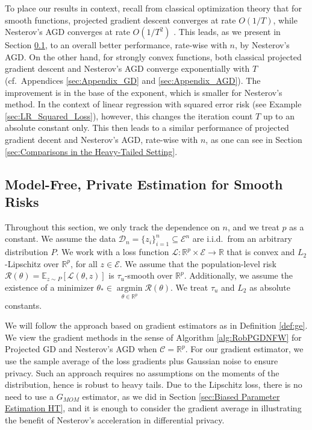 \documentclass{article}
\begin{document}
To place our results in context, recall from classical optimization theory that for smooth functions, projected gradient descent converges at rate $O\left(1/T\right)$, while Nesterov's AGD converges at rate $O\left(1/T^2\right)$ \cite{Nester}. This leads, as we present in Section \ref{sec:Smooth_Priv_HT_GD_AGD}, to an overall better performance, rate-wise with $n$, by Nesterov's AGD. On the other hand, for strongly convex functions, both classical projected gradient descent and Nesterov's AGD converge exponentially with $T$ (cf.\ Appendices \ref{sec:Appendix_GD} and \ref{sec:Appendix_AGD}). The improvement is in the base of the exponent, which is smaller for Nesterov's method. In the context of linear regression with squared error risk (see Example \ref{sec:LR_Squared_Loss}), however, this changes the iteration count $T$ up to an absolute constant only. This then leads to a similar performance of projected gradient decent and Nesterov's AGD, rate-wise with $n$, as one can see in Section \ref{sec:Comparisons in the Heavy-Tailed Setting}.


\subsection{Model-Free, Private Estimation for Smooth Risks}
\label{sec:Smooth_Priv_HT_GD_AGD}

Throughout this section, we only track the dependence on $n$, and we treat $p$ as a constant. We assume the data $\mathcal{D}_n = \{z_i\}_{i = 1}^n \subseteq \mathcal{E}^n$ are i.i.d.\ from an arbitrary distribution $P$. We work with a loss function $\mathcal{L} : \mathbb{R}^p \times \mathcal{E} \rightarrow \mathbb{R}$ that is convex and $L_2$-Lipschitz over $\mathbb{R}^p$, for all $z \in \mathcal{E}$. We assume that the population-level risk $\mathcal{R(\theta)} = \mathbb{E}_{z \sim P}[\mathcal{L}(\theta, z)]$ is $\tau_u$-smooth over $\mathbb{R}^p$. Additionally, we assume the existence of a minimizer $\theta_* \in \mathop{\arg\min}\limits_{\theta \in \mathbb{R}^p}\mathcal{R}(\theta)$. We treat $\tau_u$ and $L_2$ as absolute constants.

We will follow the approach based on gradient estimators as in Definition \ref{def:ge}. We view the gradient methods in the sense of Algorithm \ref{alg:RobPGDNFW} for Projected GD and Nesterov's AGD when $\mathcal{C} = \mathbb{R}^p$. For our gradient estimator, we use the sample average of the loss gradients plus Gaussian noise to ensure privacy. Such an approach requires no assumptions on the moments of the distribution, hence is robust to heavy tails. Due to the Lipschitz loss, there is no need to use a $G_{MOM}$ estimator, as we did in Section \ref{sec:Biased Parameter Estimation HT}, and it is enough to consider the gradient average in illustrating the benefit of Nesterov's acceleration in differential privacy.
\end{document}
